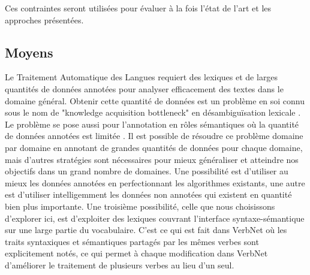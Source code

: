 Ces contraintes seront utilisées pour évaluer à la fois l'état de l'art et les
approches présentées.

\subsection{Moyens}
\label{objectifs_these}


Le Traitement Automatique des Langues requiert des lexiques et de larges
quantités de données annotées pour analyser efficacement des textes dans le
domaine général. Obtenir cette quantité de données est un problème en soi connu
sous le nom de "knowledge acquisition bottleneck" en désambiguïsation lexicale
\citep{gale1992method,navigli2009word}. Le problème se pose aussi pour
l'annotation en rôles sémantiques où la quantité de données annotées est
limitée \citep[section 1]{das2012structure}. Il est possible de résoudre ce
problème domaine par domaine en annotant de grandes quantités de données pour
chaque domaine, mais d'autres stratégies sont nécessaires pour mieux
généraliser et atteindre nos objectifs dans un grand nombre de domaines. Une
possibilité est d'utiliser au mieux les données annotées en perfectionnant les
algorithmes existants, une autre est d'utiliser intelligemment les données non
annotées qui existent en quantité bien plus importante. Une troisième
possibilité, celle que nous choisissons d'explorer ici, est d'exploiter des
lexiques couvrant l'interface syntaxe-sémantique sur une large partie du
vocabulaire. C'est ce qui est fait dans VerbNet où les traits syntaxiques et
sémantiques partagés par les mêmes verbes sont explicitement notés, ce qui
permet à chaque modification dans VerbNet d'améliorer le traitement de
plusieurs verbes au lieu d'un seul.


